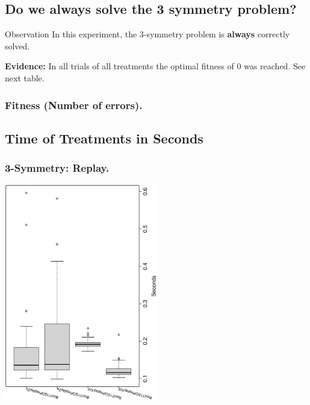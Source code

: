 \documentclass[18pt,c]{beamer}
\makeatletter
\let\beamer@writeslidentry@miniframeson=\beamer@writeslidentry
\newcommand*{\miniframeson}{\let\beamer@writeslidentry=\beamer@writeslidentry@miniframeson}
\makeatother
\begin{document}
\subsection{Do we {\bf always} solve the 3 symmetry problem?}
\begin{frame}
\vspace*{2mm}
\begin{block}{
Observation
}
In this experiment, the 3-symmetry problem is {\bf always} correctly solved.
 
{\bf Evidence:}
In all trials of all treatments the optimal fitness of $0$ was reached.
See next table.
\end{block}
\end{frame}%
 \begin{frame}
 \fontsize{8pt}{9pt}\selectfont
 \frametitle{ Fitness (Number of errors). }

 \label{ExpCStatsTable000.tex}  
 \end{frame}

\miniframeson
\subsection{Time of Treatments in Seconds}
 \begin{frame}
 \frametitle{ 3-Symmetry: Replay.  }
 \begin{center}
\includegraphics[width=0.5\textwidth, angle=-90]
{ExpCboxplottSeconds000.eps}
 \end{center}
 \label{ExpCboxplottSeconds000.eps}  
 \end{frame}
\end{document}
